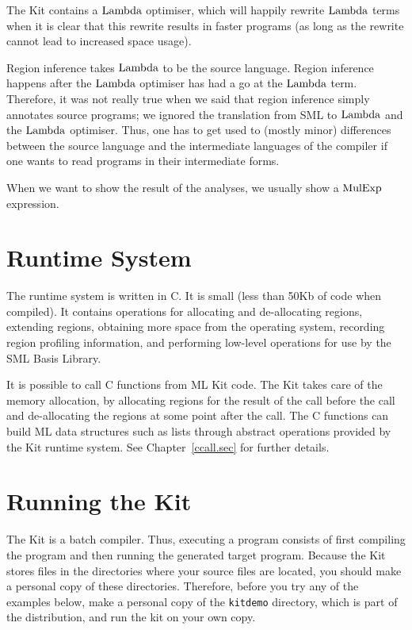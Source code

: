 \documentclass[12pt]{book}
\begin{document}
The Kit contains a $\hbox{\rm Lambda}$ optimiser,
which will happily rewrite $\hbox{\rm Lambda}$ terms when it is clear that this rewrite results in faster programs
(as long as the rewrite cannot lead to increased space usage).

Region inference takes $\hbox{\rm Lambda}$ to be the source language. Region inference happens after
the $\hbox{\rm Lambda}$ optimiser has had a go at the $\hbox{\rm Lambda}$ term. 
Therefore, it was not really true when we said that region inference simply annotates source
programs;  we ignored the translation from SML to $\hbox{\rm Lambda}$ and
the $\hbox{\rm Lambda}$ optimiser. Thus, one has to get used to (mostly minor) differences between
the source language and the intermediate languages of the compiler if one wants to read
programs in their intermediate forms.

When we want to show the result of the analyses, we usually show a $\hbox{\rm MulExp}$ expression.

\section{Runtime System}
The runtime system is written in C. It is small (less than 50Kb 
of code when compiled).
It contains operations for allocating and de-allocating regions, extending regions,
obtaining more space from the operating system, recording region profiling information, and performing
low-level operations for use by the SML Basis Library.

It is possible to call C functions from ML Kit code.
The Kit takes care of the memory allocation, by allocating regions for
the result of the call before the call and de-allocating the regions
at some point after the call. The C functions can build ML data
structures such as lists through abstract operations provided by the
Kit runtime system. See Chapter~\ref{ccall.sec} for further details.

\section{Running the Kit}
\label{tryit.sec}

The Kit is a batch compiler. Thus, executing a
program consists of first compiling the program and then running the
generated target program. Because the Kit stores files in the
directories where your source files are located, you should make a
personal copy of these directories. Therefore, 
before you try any of the examples below, 
make a personal copy of the {\tt kitdemo} directory, which is
part of the distribution, and run the kit on your own copy.
\end{document}
